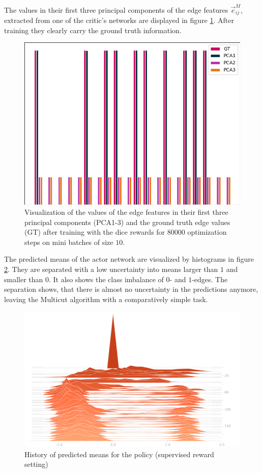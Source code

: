 The values in their first three principal components of the edge features $\vec{e}_{ij}^M$, extracted from one of the critic's networks are displayed in figure \ref{fig:res_edge_embed}. After training they clearly carry the ground truth information.\\

\begin{figure}[ht!]
	\centering
	\includegraphics[width=.5\textwidth]{figures/plots/edge_embeddings.png}
	\caption{Visualization of the values of the edge features in their first three principal components (PCA1-3) and the ground truth edge values (GT) after training with the dice rewards for $80000$ optimization steps on mini batches of size $10$.}
	\label{fig:res_edge_embed}
\end{figure}

The predicted means of the actor network are visualized by histograms in figure \ref{fig:pred_means}. They are separated with a low uncertainty into means larger than $1$ and smaller than $0$. It also shows the class imbalance of $0$- and $1$-edges. The separation shows, that there is almost no uncertainty in the predictions anymore, leaving the Multicut algorithm with a comparatively simple task.

\begin{figure}[ht!]
	\centering
	\includegraphics[width=.7\textwidth]{figures/plots/logit_means_hist.png}
	\caption{History of predicted means for the policy (supervised reward setting)}
	\label{fig:pred_means}
\end{figure}

